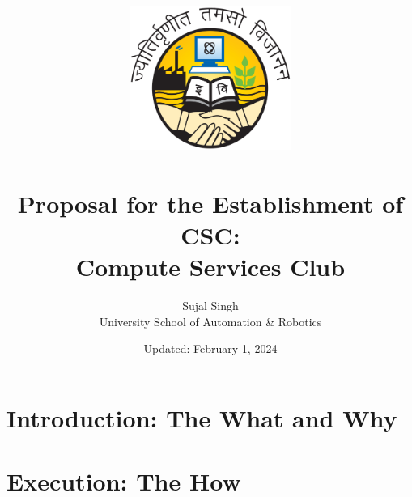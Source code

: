\documentclass[a4paper,11pt,twocolumn,oneside]{book}
\title{
    \includegraphics[width=150pt]{./images/ipu}
    \\
    \textbf{\\Proposal for the Establishment of CSC: \\ Compute Services Club}
}
\author{Sujal Singh \\ University School of Automation \& Robotics}
\date{Updated: February 1, 2024}
\begin{document}
    \maketitle
    
    \tableofcontents


    \chapter{Introduction: The What and Why}\label{ch:introduction}
    


    \chapter{Execution: The How}\label{ch:execution:-the-how}
    
\end{document}
